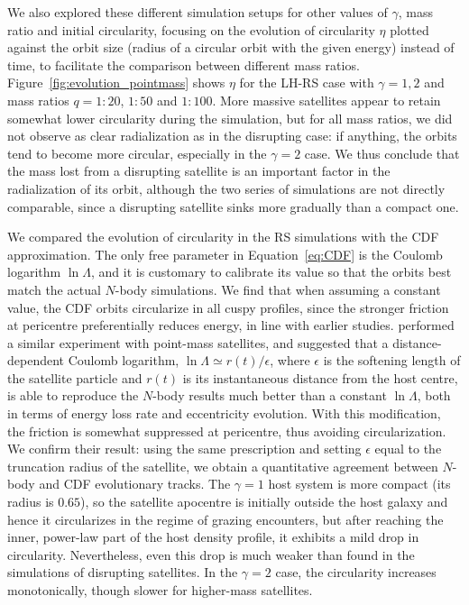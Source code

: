 \documentclass[twocolumn]{aastex63}
\newcommand{\LH}{\textsf{L\!H}\xspace}
\newcommand{\RS}{\textsf{R\!S}\xspace}
\begin{document}
We also explored these different simulation setups for other values of $\gamma$, mass ratio and initial circularity, focusing on the evolution of circularity $\eta$ plotted against the orbit size (radius of a circular orbit with the given energy) instead of time, to facilitate the comparison between different mass ratios. Figure~\ref{fig:evolution_pointmass} shows $\eta$ for the \LH-\RS case with $\gamma=1,2$ and mass ratios $q=1:20$, $1:50$ and $1:100$. More massive  satellites appear to retain somewhat lower circularity during the simulation, but for all mass ratios, we did not observe as clear radialization as in the disrupting case: if anything, the orbits tend to become more circular, especially in the $\gamma=2$ case. We thus conclude that the mass lost from a disrupting satellite is an important factor in the radialization of its orbit, although the two series of simulations are not directly comparable, since a disrupting satellite sinks more gradually than a compact one.

We compared the evolution of circularity in the \RS simulations with the CDF approximation. The only free parameter in Equation~\ref{eq:CDF} is the Coulomb logarithm $\ln\Lambda$, and it is customary to calibrate its value so that the orbits best match the actual $N$-body simulations. We find that when assuming a constant value, the CDF orbits circularize in all cuspy profiles, since the stronger friction at pericentre preferentially reduces energy, in line with earlier studies. \citet{Hashimoto2003} performed a similar experiment with point-mass satellites, and suggested that a distance-dependent Coulomb logarithm, $\ln\Lambda \simeq r(t) / \epsilon$, where $\epsilon$ is the softening length of the satellite particle and $r(t)$ is its instantaneous distance from the host centre, is able to reproduce the $N$-body results much better than a constant $\ln\Lambda$, both in terms of energy loss rate and eccentricity evolution. With this modification, the friction is somewhat suppressed at pericentre, thus avoiding circularization. We confirm their result: using the same prescription and setting $\epsilon$ equal to the truncation radius of the satellite, we obtain a quantitative agreement between $N$-body and CDF evolutionary tracks. The $\gamma=1$ host system is more compact (its radius is $0.65$), so the satellite apocentre is initially outside the host galaxy and hence it circularizes in the regime of grazing encounters, but after reaching the inner, power-law part of the host density profile, it exhibits a mild drop in circularity. Nevertheless, even this drop is much weaker than found in the simulations of disrupting satellites. In the $\gamma=2$ case, the circularity increases monotonically, though slower for higher-mass satellites. 
\end{document}
